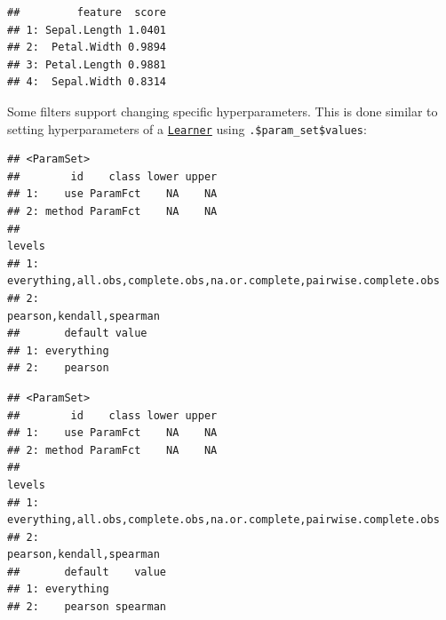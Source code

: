 \documentclass[]{scrbook}
\newenvironment{Shaded}{\begin{snugshade}}{\end{snugshade}}
\newcommand{\CommentTok}[1]{\textcolor[rgb]{0.56,0.35,0.01}{\textit{#1}}}
\newcommand{\DataTypeTok}[1]{\textcolor[rgb]{0.13,0.29,0.53}{#1}}
\newcommand{\KeywordTok}[1]{\textcolor[rgb]{0.13,0.29,0.53}{\textbf{#1}}}
\newcommand{\NormalTok}[1]{#1}
\newcommand{\OperatorTok}[1]{\textcolor[rgb]{0.81,0.36,0.00}{\textbf{#1}}}
\newcommand{\StringTok}[1]{\textcolor[rgb]{0.31,0.60,0.02}{#1}}
\renewenvironment{Shaded} {\begin{snugshade}\small} {\end{snugshade}}
\begin{document}
\begin{verbatim}
##         feature  score
## 1: Sepal.Length 1.0401
## 2:  Petal.Width 0.9894
## 3: Petal.Length 0.9881
## 4:  Sepal.Width 0.8314
\end{verbatim}

Some filters support changing specific hyperparameters.
This is done similar to setting hyperparameters of a \href{https://mlr3.mlr-org.com/reference/Learner.html}{\texttt{Learner}} using \texttt{.\$param\_set\$values}:

\begin{Shaded}
\end{Shaded}

\begin{verbatim}
## <ParamSet>
##        id    class lower upper
## 1:    use ParamFct    NA    NA
## 2: method ParamFct    NA    NA
##                                                                  levels
## 1: everything,all.obs,complete.obs,na.or.complete,pairwise.complete.obs
## 2:                                             pearson,kendall,spearman
##       default value
## 1: everything      
## 2:    pearson
\end{verbatim}

\begin{Shaded}
\end{Shaded}

\begin{verbatim}
## <ParamSet>
##        id    class lower upper
## 1:    use ParamFct    NA    NA
## 2: method ParamFct    NA    NA
##                                                                  levels
## 1: everything,all.obs,complete.obs,na.or.complete,pairwise.complete.obs
## 2:                                             pearson,kendall,spearman
##       default    value
## 1: everything         
## 2:    pearson spearman
\end{verbatim}
\end{document}
